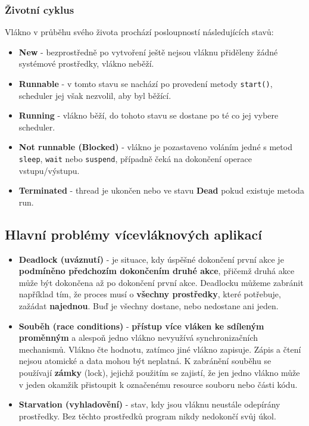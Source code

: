 \subsubsection{Životní cyklus}
Vlákno v průběhu svého života prochází posloupností následujících stavů:
\begin{itemize}
\item \textbf{New} - bezprostředně po vytvoření ještě nejsou vláknu přiděleny žádné systémové prostředky, vlákno neběží.
\item \textbf{Runnable} - v tomto stavu se nachází po provedení metody \texttt{start()}, scheduler jej však nezvolil, aby byl běžící.
\item \textbf{Running} - vlákno běží, do tohoto stavu se dostane po té co jej vybere scheduler.
\item \textbf{Not runnable (Blocked)} - vlákno je pozastaveno voláním jedné s metod \texttt{sleep}, \texttt{wait} nebo \texttt{suspend}, případně čeká na dokončení operace vstupu/výstupu.
\item \textbf{Terminated} - thread je ukončen nebo ve stavu \textbf{Dead} pokud existuje metoda run.
\end{itemize}

\subsection{Hlavní problémy vícevláknových aplikací}
\begin{itemize}
\item \textbf{Deadlock (uváznutí)} - je situace, kdy úspěšné dokončení první akce je \textbf{podmíněno předchozím dokončením druhé akce}, přičemž druhá akce může být dokončena až po dokončení první akce. Deadlocku můžeme zabránit například tím, že proces musí o \textbf{všechny prostředky}, které potřebuje, zažádat \textbf{najednou}. Buď je všechny dostane, nebo nedostane ani jeden. 
\item \textbf{Souběh (race conditions)} - \textbf{přístup více vláken ke sdíleným proměnným} a alespoň jedno vlákno nevyužívá synchronizačních mechanismů. Vlákno čte hodnotu, zatímco jiné vlákno zapisuje. Zápis a čtení nejsou atomické a data mohou být neplatná. K zabránění souběhu se používají \textbf{zámky} (lock), jejichž použitím se zajistí, že jen jedno vlákno může v jeden okamžik přistoupit k označenému resource souboru nebo části kódu.
\item \textbf{Starvation (vyhladovění)} - stav, kdy jsou vláknu neustále odepírány prostředky. Bez těchto prostředků program nikdy nedokončí svůj úkol.
\end{itemize}

